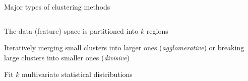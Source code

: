 \documentclass[pdf]{beamer}
\begin{document}
\begin{frame}{Major types of clustering methods}
\small
\begin{columns}
\begin{description}\addtolength{\itemsep}{3\baselineskip}
	\item<2-> [Partitional:] The data (feature) space is partitioned into $k$ regions
	\item<3-> [Hierarchical:] Iteratively merging small clusters into larger ones (\textit{agglomerative})
	or breaking large clusters into smaller ones (\textit{divisive})
	\item<4-> [Distribution-based:] Fit $k$ multivariate statistical distributions 
\end{description}
\begin{center}
	\vfill
	\vfill
\end{center}
\end{columns}
\end{frame}
\end{document}
